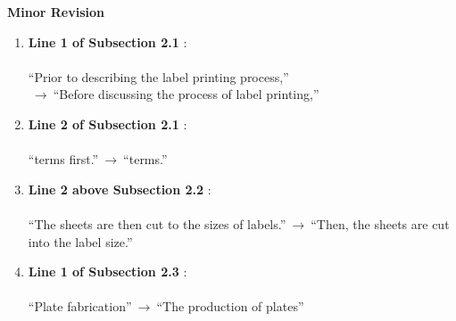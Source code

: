 \documentclass[10pt]{amsart}
\begin{document}
\newpage
\vspace{.5cm}
\begin{center}
	{\Large\bf Minor Revision}
\end{center}
\begin{enumerate}

\item {\bf Line 1 of Subsection 2.1} :\\
~\\
``Prior to describing the label printing process,''\\$~\longrightarrow~$``Before discussing the process of label printing,''\\

\item {\bf Line 2 of Subsection 2.1} :\\
~\\
``terms first.''$~\longrightarrow~$``terms.''\\

\item {\bf Line 2 above Subsection 2.2} :\\
~\\
``The sheets are then cut to the sizes of labels.''$~\longrightarrow~$``Then, the sheets are cut into the label size.''\\

\item {\bf Line 1 of Subsection 2.3} :\\
~\\
``Plate fabrication''$~\longrightarrow~$``The production of plates''\\

\end{enumerate}
\end{document}

